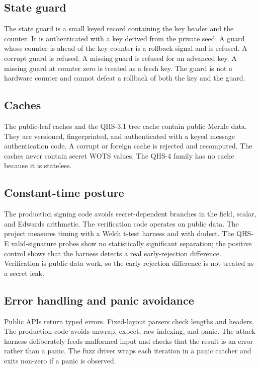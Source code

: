 \documentclass[11pt,a4paper]{article}
\begin{document}
\subsection{State guard}

The state guard is a small keyed record containing the key header and the
counter. It is authenticated with a key derived from the private seed. A guard
whose counter is ahead of the key counter is a rollback signal and is refused.
A corrupt guard is refused. A missing guard is refused for an advanced key. A
missing guard at counter zero is treated as a fresh key. The guard is not a
hardware counter and cannot defeat a rollback of both the key and the guard.

\subsection{Caches}

The public-leaf caches and the QHS-3.1 tree cache contain public Merkle data.
They are versioned, fingerprinted, and authenticated with a keyed message
authentication code. A corrupt or foreign cache is rejected and recomputed.
The caches never contain secret WOTS values. The QHS-4 family has no cache
because it is stateless.

\subsection{Constant-time posture}

The production signing code avoids secret-dependent branches in the field,
scalar, and Edwards arithmetic. The verification code operates on public data.
The project measures timing with a Welch t-test harness and with dudect. The
QHS-E valid-signature probes show no statistically significant separation;
the positive control shows that the harness detects a real early-rejection
difference. Verification is public-data work, so the early-rejection difference
is not treated as a secret leak.

\subsection{Error handling and panic avoidance}

Public APIs return typed errors. Fixed-layout parsers check lengths and
headers. The production code avoids unwrap, expect, raw indexing, and panic.
The attack harness deliberately feeds malformed input and checks that the
result is an error rather than a panic. The fuzz driver wraps each iteration in
a panic catcher and exits non-zero if a panic is observed.
\end{document}
